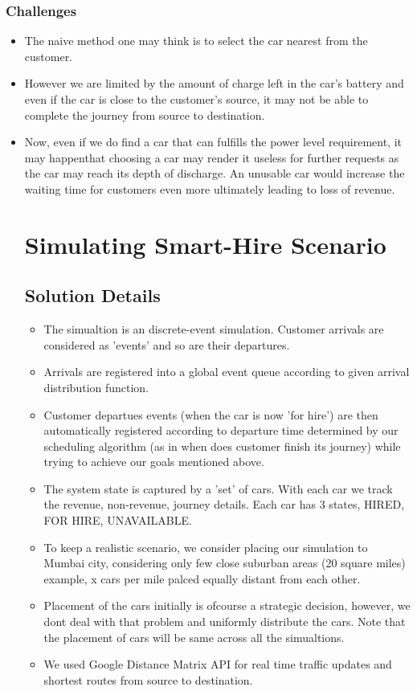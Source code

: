 \documentclass[11pt]{report}
\begin{document}
\subsection{Challenges}
\begin{itemize}
\item The naive method one may think is to select the car nearest from the
customer.
\item However we are limited by the amount of charge left in the car's battery
and even if the car is close to the customer's source, it may not be
able to complete the journey from source to destination.
\item Now, even if we do find a car that can fulfills the power level requirement,
it may happenthat choosing a car may render it useless for further requests as the car
may reach its depth of discharge. An unusable car would increase the waiting
time for customers even more ultimately leading to loss of revenue.


\chapter{Simulating Smart-Hire Scenario}

\section{Solution Details}

\begin{itemize}
\item The simualtion is an discrete-event simulation. Customer arrivals
are considered as 'events' and so are their departures.
\item Arrivals are registered into a global event queue according to given
arrival distribution function.
\item Customer departues events (when the car is now 'for hire') are then
automatically registered according to departure time determined by
our scheduling algorithm (as in when does customer finish its journey)
while trying to achieve our goals mentioned above.
\item The system state is captured by a 'set' of cars. With each car we track
the revenue, non-revenue, journey details. Each car has 3 states,
HIRED, FOR HIRE, UNAVAILABLE.
\item To keep a realistic scenario, we consider placing our simulation
to Mumbai city, considering only few close suburban areas (20 square miles)
example,
x cars per mile palced equally distant from each other.
\item Placement of the cars initially is ofcourse a strategic decision, however,
we dont deal with that problem and uniformly distribute the cars.
Note that the placement of cars will be same across all the simualtions.
\item We used Google Distance Matrix API for real time traffic updates and
shortest routes from source to destination.
\end{itemize}
\newpage


\end{itemize}
\end{document}
